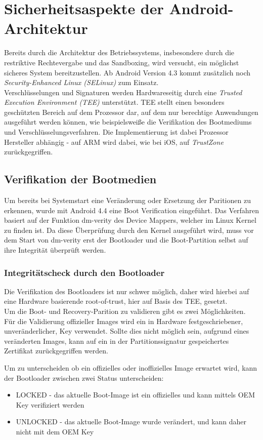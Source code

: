 \section{Sicherheitsaspekte der Android-Architektur}

	Bereits durch die Architektur des Betriebssystems, insbesondere durch die restriktive Rechtevergabe und das Sandboxing, wird versucht, ein möglichst sicheres System bereitzustellen. Ab Android Version 4.3 kommt zusätzlich noch \textit{Security-Enhanced Linux (SELinux)} zum Einsatz.\\
	Verschlüsselungen und Signaturen werden Hardwareseitig durch eine \textit{Trusted Execution Environment (TEE)} unterstützt. TEE stellt einen besonders geschützten Bereich auf dem Prozessor dar, auf dem nur berechtige Anwendungen ausgeführt werden können, wie beispielsweiße die Verifikation des Bootmediums und Verschlüsselungsverfahren. Die Implementierung ist dabei Prozessor Hersteller abhängig - auf ARM wird dabei, wie bei iOS, auf \textit{TrustZone}\cite{TEE_ARM} zurückgegriffen.
	
	\subsection{Verifikation der Bootmedien}
	Um bereits bei Systemstart eine Veränderung oder Ersetzung der Paritionen zu erkennen, wurde mit Android 4.4 eine Boot Verification eingeführt. Das Verfahren basiert auf der Funktion dm-verity des Device Mappers, welcher im Linux Kernel zu finden ist. Da diese Überprüfung durch den Kernel ausgeführt wird, muss vor dem Start von dm-verity erst der Bootloader und die Boot-Partition selbst auf ihre Integrität überprüft werden.
	
	\subsubsection{Integritätscheck durch den Bootloader}
	Die Verifikation des Bootloaders ist nur schwer möglich, daher wird hierbei auf eine Hardware basierende root-of-trust, hier auf Basis des TEE, gesetzt. \\
	Um die Boot- und Recovery-Parition zu validieren gibt es zwei Möglichkeiten. Für die Validierung offizieller Images wird ein in Hardware festgeschriebener, unveränderlicher, Key verwendet. Sollte dies nicht möglich sein, aufgrund eines veränderten Images, kann auf ein in der Partitionssignatur gespeichertes Zertifikat zurückgegriffen werden.
\begin{flushleft}	
	Um zu unterscheiden ob ein offizielles oder inoffizielles Image erwartet wird, kann der Bootloader zwischen zwei Status unterscheiden:\\
\end{flushleft}
	\begin{itemize}\itemsep0pt
		\item LOCKED - das aktuelle Boot-Image ist ein offizielles und kann mittels OEM Key verifiziert werden
		\item UNLOCKED - das aktuelle Boot-Image wurde verändert, und kann daher nicht mit dem OEM Key
	\end{itemize}
	

